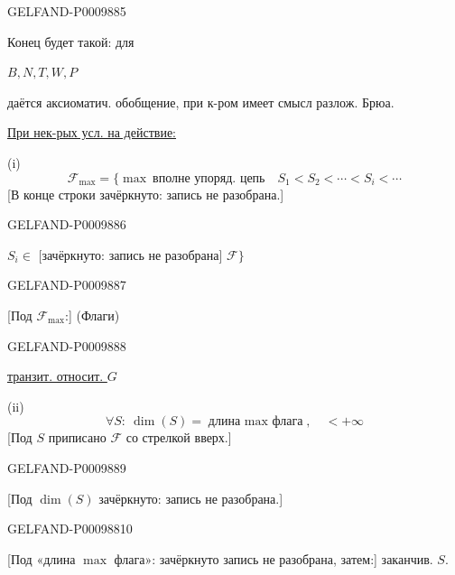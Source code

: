 \begin{GelfandAdjacentEvidence}{GELFAND-P000988}{5}


Конец будет такой: для

$B,N,T,W,P$

даётся аксиоматич. обобщение, при к-ром имеет смысл разлож. Брюа.

\underline{При нек-рых усл. на действие:}

(i)
\[
\mathcal F_{\max}=\{\max\ \text{вполне упоряд. цепь}\quad
S_1<S_2<\cdots<S_i<\cdots
\]
[В конце строки зачёркнуто: запись не разобрана.]
\end{GelfandAdjacentEvidence}
\begin{GelfandAdjacentEvidence}{GELFAND-P000988}{6}


$S_i\in$ [зачёркнуто: запись не разобрана] $\mathcal F\}$
\end{GelfandAdjacentEvidence}
\begin{GelfandAdjacentEvidence}{GELFAND-P000988}{7}


[Под $\mathcal F_{\max}$:] (Флаги)

\end{GelfandAdjacentEvidence}
\begin{GelfandAdjacentEvidence}{GELFAND-P000988}{8}


\underline{транзит. относит. $G$}

(ii)
\[
\forall S:\ \dim(S)=\text{длина $\max$ флага},\quad<+\infty
\]
[Под $S$ приписано $\mathcal F$ со стрелкой вверх.]
\end{GelfandAdjacentEvidence}
\begin{GelfandAdjacentEvidence}{GELFAND-P000988}{9}


[Под $\dim(S)$ зачёркнуто: запись не разобрана.]
\end{GelfandAdjacentEvidence}
\begin{GelfandAdjacentEvidence}{GELFAND-P000988}{10}


[Под «длина $\max$ флага»: зачёркнуто запись не разобрана, затем:] заканчив. $S$.
\end{GelfandAdjacentEvidence}
